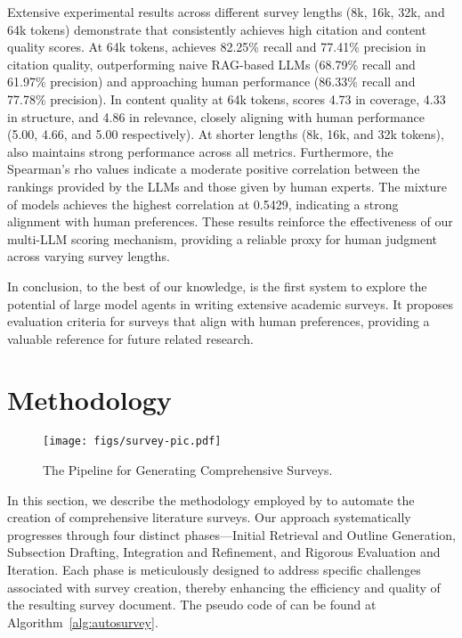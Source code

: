 Extensive experimental results across different survey lengths (8k, 16k, 32k, and 64k tokens) demonstrate that \ourmethod consistently achieves high citation and content quality scores. At 64k tokens, \ourmethod achieves 82.25\% recall and 77.41\% precision in citation quality, outperforming naive RAG-based LLMs (68.79\% recall and 61.97\% precision) and approaching human performance (86.33\% recall and 77.78\% precision). In content quality at 64k tokens, \ourmethod scores 4.73 in coverage, 4.33 in structure, and 4.86 in relevance, closely aligning with human performance (5.00, 4.66, and 5.00 respectively). At shorter lengths (8k, 16k, and 32k tokens), \ourmethod also maintains strong performance across all metrics. Furthermore, the Spearman's rho values indicate a moderate positive correlation between the rankings provided by the LLMs and those given by human experts. The mixture of models achieves the highest correlation at 0.5429, indicating a strong alignment with human preferences. These results reinforce the effectiveness of our multi-LLM scoring mechanism, providing a reliable proxy for human judgment across varying survey lengths.
 
In conclusion, to the best of our knowledge, \ourmethod is the first system to explore the potential of large model agents in writing extensive academic surveys. It proposes evaluation criteria for surveys that align with human preferences, providing a valuable reference for future related research.

\section{Methodology}

\begin{figure}[t!]
\centering
    \texttt{[image: figs/survey-pic.pdf]}
    \caption{The \ourmethod Pipeline for Generating Comprehensive Surveys.}
    \label{fig-main-fig}

\end{figure}

In this section, we describe the methodology employed by \ourmethod to automate the creation of comprehensive literature surveys. Our approach systematically progresses through four distinct phases---Initial Retrieval and Outline Generation, Subsection Drafting, Integration and Refinement, and Rigorous Evaluation and Iteration. Each phase is meticulously designed to address specific challenges associated with survey creation, thereby enhancing the efficiency and quality of the resulting survey document. The pseudo code of \ourmethod can be found at Algorithm~\ref{alg:autosurvey}.

